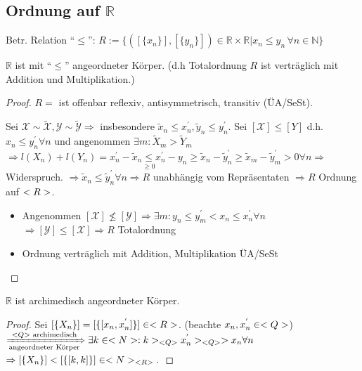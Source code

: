 \subsection{Ordnung auf \texorpdfstring{$\mathbb{R}$}{R}}
\begin{*definition}
	Betr. Relation "`$\le$"': $R:=\{ ([\{x_n\}],[\{y_n\}])\in\mathbb{R}\times\mathbb{R} | x_n \le y_n\,\forall n\in\mathbb{N}\}$
\end{*definition}
\begin{proposition}
	$\mathbb{R}$ ist mit "`$\le$"' angeordneter Körper. (d.h Totalordnung $R$ ist verträglich mit Addition und Multiplikation.)
\end{proposition}

\begin{proof}
	$R=$ ist offenbar reflexiv, antisymmetrisch, transitiv (ÜA/SeSt).
	
	Sei $\mathcal{X} \sim \tilde{\mathcal{X}}, \mathcal{Y} \sim \tilde{\mathcal{Y}} \Rightarrow $ insbesondere $\tilde{x}_n \le x_n^{'}, \tilde{y}_n \le y_n^{'}$.
	Sei $[\mathcal{X}] \le [Y]$ d.h. $x_n \le y_n^{'} \forall n$ und angenommen $\exists m\colon \tilde{X}_m > \tilde{Y}_m$
	$\Rightarrow l(X_n) + l(Y_n) = x_n^{'} - \underset{\ge 0}{\tilde{x}_n \le x_n^{'}} - y_n \ge \tilde{x}_n - \tilde{y}_n^{'} \ge \tilde{x}_m - \tilde{y}_m^{'} > 0 \forall n \Rightarrow$ Widerspruch.
	$\Rightarrow \tilde{x}_n \le \tilde{y}_n^{'} \forall n \Rightarrow R$ unabhängig vom Repräsentaten $\Rightarrow R$ Ordnung auf $<R>$.
	\begin{itemize}
		\item Angenommen $[\mathcal{X}] \not \le [\mathcal{Y}] \Rightarrow \exists m\colon y_n \le y_m^{'} < x_n \le x_n^{'} \forall n$
		$\Rightarrow [\mathcal{Y}] \le [\mathcal{X}] \Rightarrow R$ Totalordnung
		\item Ordnung verträglich mit Addition, Multiplikation ÜA/SeSt
	\end{itemize}
\end{proof}

\begin{proposition}
	$\mathbb{R}$ ist archimedisch angeordneter Körper.
\end{proposition}

\begin{proof}
	Sei $[\{X_n\}] = [\{ [x_n,x_n^{'}]\}] \in <R>$. (beachte $x_n, x_n^{'} \in <Q>$)
	$\xRightarrow[\text{angeordneter Körper}]{<Q>\text{ archimedisch}} \exists k \in <N>: k >_{<Q>} x_n^{'} >_{<Q>} > x_n \forall n$
	$\Rightarrow [\{X_n\}] < [\{[k,k]\}] \in <N>_{<R>}.$
\end{proof}

